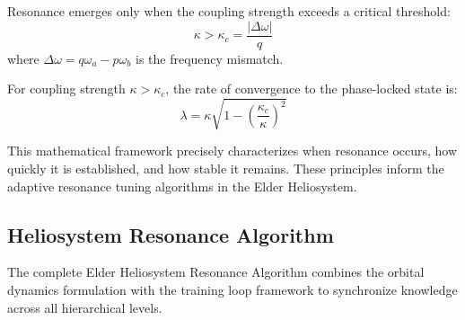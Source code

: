 \begin{theorem}
Resonance emerges only when the coupling strength exceeds a critical threshold:
\begin{equation}
\kappa > \kappa_c = \frac{|\Delta\omega|}{q}
\end{equation}
where $\Delta\omega = q\omega_a - p\omega_b$ is the frequency mismatch.
\end{theorem}

\begin{corollary}
For coupling strength $\kappa > \kappa_c$, the rate of convergence to the phase-locked state is:
\begin{equation}
\lambda = \kappa\sqrt{1 - \left(\frac{\kappa_c}{\kappa}\right)^2}
\end{equation}
\end{corollary}

This mathematical framework precisely characterizes when resonance occurs, how quickly it is established, and how stable it remains. These principles inform the adaptive resonance tuning algorithms in the Elder Heliosystem.

\subsection{Heliosystem Resonance Algorithm}

The complete Elder Heliosystem Resonance Algorithm combines the orbital dynamics formulation with the training loop framework to synchronize knowledge across all hierarchical levels.

